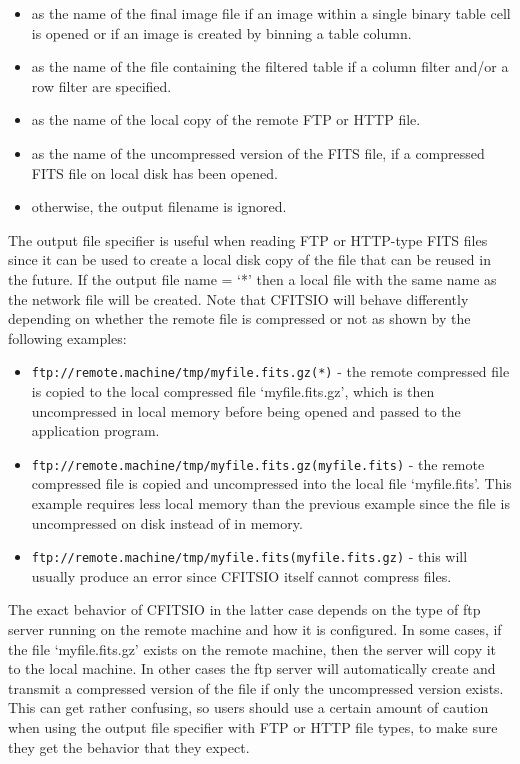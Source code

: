 \documentclass[11pt]{book}
\begin{document}
\begin{itemize}
\item
as the name of the final image file if an image within a single binary
table cell is opened or if an image is created by binning a table column.
\item
as the name of the file containing the filtered table if a column filter
and/or a row filter are specified.
\item
as the name of the local copy of the remote FTP or HTTP file.
\item
as the name of the uncompressed version of the FITS file, if a
compressed FITS file on local disk has been opened.
\item
otherwise, the output filename is ignored.
\end{itemize}

The output file specifier is useful when reading FTP or HTTP-type
FITS files since it can be used to create a local disk copy of the file
that can be reused in the future.  If the output file name = `*' then a
local file with the same name as the network file will be created.
Note that CFITSIO will behave differently depending on whether the
remote file is compressed or not as shown by the following examples:
\begin{itemize}
\item
\verb+ftp://remote.machine/tmp/myfile.fits.gz(*)+ - the remote compressed
file is copied to the local compressed file `myfile.fits.gz', which
is then uncompressed in local memory before being opened and passed
to the application program.

\item
\verb+ftp://remote.machine/tmp/myfile.fits.gz(myfile.fits)+ - the
remote compressed file is copied and uncompressed into the local file
`myfile.fits'.  This example requires less local memory than the
previous example since the file is uncompressed on disk instead of in
memory.

\item
\verb+ftp://remote.machine/tmp/myfile.fits(myfile.fits.gz)+ - this will
usually produce an error since CFITSIO itself cannot compress files.
\end{itemize}

The exact behavior of CFITSIO in the latter case depends on the type of
ftp server running on the remote machine and how it is configured.  In
some cases, if the file `myfile.fits.gz' exists on the remote machine,
then the server will copy it to the local machine.  In other cases the
ftp server will automatically create and transmit a compressed version
of the file if only the uncompressed version exists.  This can get
rather confusing, so users should use a certain amount of caution when
using the output file specifier with FTP or HTTP file types, to make
sure they get the behavior that they expect.
\end{document}
